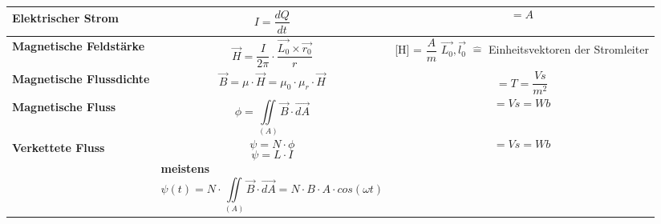 \begin{tabular}{| C{5cm} | P{7cm} | P{6cm} |}
\firsthline
\textbf{Elektrischer Strom} 	    &   \begin{equation*}
I = \dfrac{dQ}{dt}	
\end{equation*}												   &  \begin{equation*}
[I] = A
\end{equation*} 				\\
\hline
\textbf{Magnetische Feldstärke} \newline \newline {} & \begin{equation*}
\vec{H} = \dfrac{I}{2\pi}\cdot\dfrac{\vec{L_0}\times\vec{r_0}}{r}  
\end{equation*}       &  [H] = $\dfrac{A}{m}$ \newline $\vec{L_0},\vec{l_0}$ $\widehat{=}$ Einheitsvektoren der Stromleiter\\
\hline
\textbf{Magnetische Flussdichte}  & \begin{equation*}
\vec{B} = \mu\cdot\vec{H} = \mu_0\cdot\mu_r\cdot\vec{H}
\end{equation*}			   	   &  \begin{equation*}
[B] = T=\dfrac{Vs}{m^2}
\end{equation*} \\
\hline
\textbf{Magnetische Fluss} \newline {}		 & \begin{equation*}
\phi = \iint\limits_{(A)}\vec{B}\cdot\vec{dA}
\end{equation*}								   &  \begin{equation*}
[\phi] = Vs = Wb
\end{equation*} \\
\hline
\textbf{Verkettete Fluss}\newline {}		 & \begin{equation*}
\psi = N\cdot\phi
\end{equation*} \begin{equation*}
\psi = L\cdot I
\end{equation*}\centering\textbf{meistens}  \begin{equation*}
\psi(t) = N\cdot\iint\limits_{(A)}\vec{B}\cdot\vec{dA}=N\cdot B \cdot A \cdot cos\left(\omega t\right)
\end{equation*} &  \begin{equation*}
[\psi] = Vs = Wb
\end{equation*} \\
\hline
\end{tabular}
